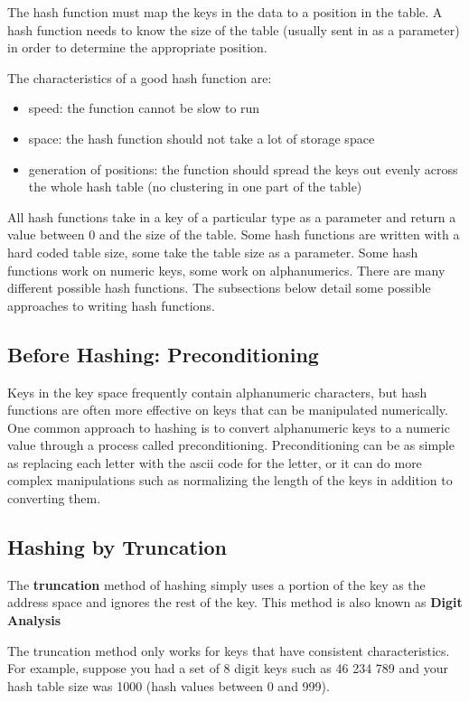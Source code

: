 The hash function must map the keys in the data to a position in the table.   A hash function needs to know the size of the table (usually sent in as a parameter) in order to determine the appropriate position.
     
The characteristics of a good hash function are:
\begin{itemize}
\item speed: the function cannot be slow to run
\item space: the hash function should not take a lot of storage space
\item generation of positions: the function should spread the keys out evenly across the whole hash table (no clustering in one part of the table)
\end{itemize}

All hash functions take in a key of a particular type as a parameter and return a value between 0 and the size of the table.   Some hash functions are written with a hard coded table size,  some take the table size as a parameter.  Some hash functions work on numeric keys,  some work on alphanumerics.   There are many different possible hash functions.  The subsections below detail some possible approaches to writing hash functions.

\subsection{Before Hashing: Preconditioning}

     Keys in the key space frequently contain alphanumeric characters, but hash functions are often more effective on keys that can be manipulated numerically. One common approach to hashing is to convert alphanumeric keys to a numeric value through a process called preconditioning. Preconditioning can be as simple as replacing each letter with the ascii code for the  letter, or it can do more complex manipulations such as normalizing the length of the keys in addition to converting them. 
   
\subsection{ Hashing by Truncation}

    The \textbf{truncation} method of hashing simply uses a portion of the key as the 
       address space and ignores the rest of the key.  This method is also known as \textbf{Digit Analysis}
       

     The truncation method only works for keys that have consistent characteristics.  For example, suppose you had a set of 8 digit keys such as 46 234 789 and your hash table size was 1000 (hash values between 0 and 999).
     
